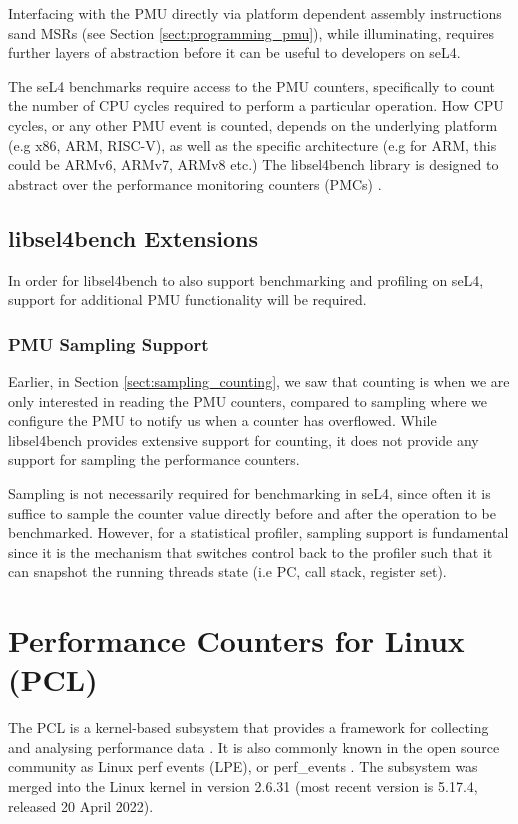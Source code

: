 Interfacing with the PMU directly via platform dependent assembly instructions sand MSRs (see Section \ref{sect:programming_pmu}), while illuminating, requires further layers of abstraction before it can be useful to developers on seL4. 

The seL4 benchmarks require access to the PMU counters, specifically to count the number of CPU cycles required to perform a particular operation. How CPU cycles, or any other PMU event is counted, depends on the underlying platform (e.g x86, ARM, RISC-V), as well as the specific architecture (e.g for ARM, this could be ARMv6, ARMv7, ARMv8 etc.) The libsel4bench library is designed to abstract over the performance monitoring counters (PMCs) \cite{github_libsel4bench_sel4bench_header}.

\subsection{libsel4bench Extensions}

In order for libsel4bench to also support benchmarking and profiling on seL4, support for additional PMU functionality will be required. 

\subsubsection{PMU Sampling Support}
Earlier, in Section \ref{sect:sampling_counting}, we saw that counting is when we are only interested in reading the PMU counters, compared to sampling where we configure the PMU to notify us when a counter has overflowed. While libsel4bench provides extensive support for counting, it does not provide any support for sampling the performance counters.

Sampling is not necessarily required for benchmarking in seL4, since often it is suffice to sample the counter value directly before and after the operation to be benchmarked. However, for a statistical profiler, sampling support is fundamental since it is the mechanism that switches control back to the profiler such that it can snapshot the running threads state (i.e PC, call stack, register set).

\section{Performance Counters for Linux (PCL)}\label{sect:pcl}

The PCL is a kernel-based subsystem that provides a framework for collecting and analysing performance data \cite{DocsRedHatPCL}. It is also commonly known in the open source community as Linux perf events (LPE), or perf\_events \cite{BlogBrendandGreggPerf}. The subsystem was merged into the Linux kernel in version 2.6.31 \cite{DocsUnofficialLinxPerfEvents} (most recent version is 5.17.4, released 20 April 2022). 

